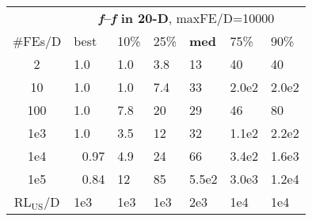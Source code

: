 \begin{tabular}{c|llllll}
 & \multicolumn{6}{|c}{\textbf{\textit{f}\raisebox{-0.35ex}{1}--\textit{f}\raisebox{-0.35ex}{24} in 20-D}, maxFE/D=10000}\\
\#FEs/D & best & 10\% & 25\% & \textbf{med} & 75\% & 90\%\\
2 & \hspace*{1ex}1.0 & \hspace*{1ex}1.0 & \hspace*{1ex}3.8 & 13 & 40 & 40\\
10 & \hspace*{1ex}1.0 & \hspace*{1ex}1.0 & \hspace*{1ex}7.4 & 33 & 2.0e2 & 2.0e2\\
100 & \hspace*{1ex}1.0 & \hspace*{1ex}7.8 & 20 & 29 & 46 & 80\\
1e3 & \hspace*{1ex}1.0 & \hspace*{1ex}3.5 & 12 & 32 & 1.1e2 & 2.2e2\\
1e4 & ~\,0.97 & \hspace*{1ex}4.9 & 24 & 66 & 3.4e2 & 1.6e3\\
1e5 & ~\,0.84 & 12 & 85 & 5.5e2 & 3.0e3 & 1.2e4\\
$\text{RL}_{\text{US}}$/D & 1e3 & 1e3 & 1e3 & 2e3 & 1e4 & 1e4
\end{tabular}
